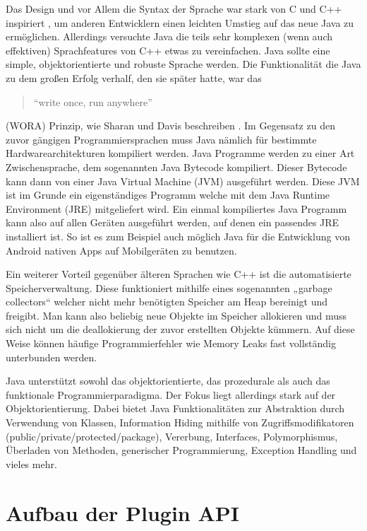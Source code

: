 Das Design und vor Allem die Syntax der Sprache war stark von C und C++ inspiriert \cite{SharanKishori2022BJ1f}, 
um anderen Entwicklern einen leichten Umstieg auf das neue Java zu ermöglichen. 
Allerdings versuchte Java die teils sehr komplexen (wenn auch effektiven) 
Sprachfeatures von C++ etwas zu vereinfachen. Java sollte eine simple, objektorientierte 
und robuste Sprache werden. Die Funktionalität die Java zu dem großen Erfolg verhalf, 
den sie später hatte, war das 
\begin{quote}\begin{english}\enquote{write once, run anywhere}\end{english}\end{quote}
(WORA) Prinzip, wie Sharan und Davis beschreiben \cite{SharanKishori2022BJ1f}. Im Gegensatz 
zu den zuvor gängigen Programmiersprachen muss Java nämlich für bestimmte 
Hardwarearchitekturen kompiliert werden. Java Programme werden zu einer Art 
Zwischensprache, dem sogenannten Java Bytecode kompiliert. Dieser Bytecode
kann dann von einer Java Virtual Machine (JVM) ausgeführt werden. Diese JVM ist
im Grunde ein eigenständiges Programm welche mit dem Java Runtime Environment 
(JRE) mitgeliefert wird. Ein einmal kompiliertes Java Programm kann also auf 
allen Geräten ausgeführt werden, auf denen ein passendes JRE installiert ist. 
So ist es zum Beispiel auch möglich Java für die Entwicklung von Android nativen
Apps auf Mobilgeräten zu benutzen.

Ein weiterer Vorteil gegenüber älteren Sprachen wie C++ ist die
automatisierte Speicherverwaltung. Diese funktioniert mithilfe eines 
sogenannten „garbage collectors“ welcher nicht mehr benötigten Speicher
am Heap bereinigt und freigibt. Man kann also beliebig neue Objekte im Speicher
allokieren und muss sich nicht um die deallokierung der zuvor erstellten Objekte
kümmern. Auf diese Weise können häufige Programmierfehler wie Memory Leaks fast 
vollständig unterbunden werden.

Java unterstützt sowohl das objektorientierte, das prozedurale als auch das funktionale 
Programmierparadigma. Der Fokus liegt allerdings stark auf der Objektorientierung. 
Dabei bietet Java Funktionalitäten zur Abstraktion durch Verwendung von Klassen, Information Hiding
mithilfe von Zugriffsmodifikatoren (public/private/protected/package), Vererbung, 
Interfaces, Polymorphismus, Überladen von Methoden, generischer Programmierung, 
Exception Handling und vieles mehr.

\section{Aufbau der Plugin API}
\label{sec:AufbauDerPluginAPI}

